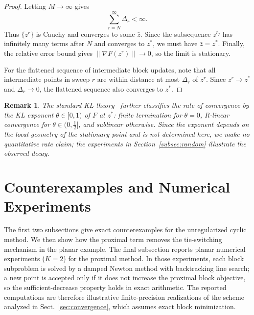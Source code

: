 \documentclass[11pt]{article}
\newtheorem{remark}{Remark}
\begin{document}
\begin{proof}
Letting \(M\to\infty\) gives
\[
    \sum_{r=N}^{\infty}\Delta_r<\infty.
\]
Thus \(\{z^r\}\) is Cauchy and converges to some \(\bar z\).  Since the subsequence \(z^{r_j}\) has infinitely many terms after \(N\) and converges to \(z^*\), we must have \(\bar z=z^*\).  Finally, the relative error bound gives \(\|\nabla F(z^r)\|\to0\), so the limit is stationary.

For the flattened sequence of intermediate block updates, note that all intermediate points in sweep \(r\) are within distance at most \(\Delta_r\) of \(z^r\).  Since \(z^r\to z^*\) and \(\Delta_r\to0\), the flattened sequence also converges to \(z^*\).
\end{proof}

\begin{remark}
The standard KL theory~\cite{attouch2013convergence} further classifies the rate of convergence by the KL exponent $\theta\in[0,1)$ of $F$ at $z^*$: finite termination for $\theta=0$, R-linear convergence for $\theta\in(0,\frac12]$, and sublinear otherwise.  Since the exponent depends on the local geometry of the stationary point and is not determined here, we make no quantitative rate claim; the experiments in Section~\ref{subsec:random} illustrate the observed decay.
\end{remark}

\section{Counterexamples and Numerical Experiments}
\label{sec:experiments}

The first two subsections give exact counterexamples for the unregularized cyclic method.  We then show how the proximal term removes the tie-switching mechanism in the planar example.  The final subsection reports planar numerical experiments (\(K=2\)) for the proximal method.  In those experiments, each block subproblem is solved by a damped Newton method with backtracking line search; a new point is accepted only if it does not increase the proximal block objective, so the sufficient-decrease property holds in exact arithmetic.  The reported computations are therefore illustrative finite-precision realizations of the scheme analyzed in Sect.~\ref{sec:convergence}, which assumes exact block minimization.
\end{document}
